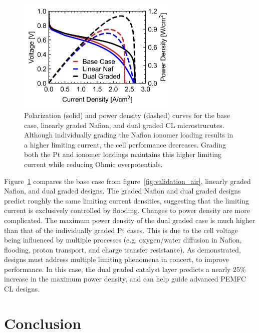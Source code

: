 \documentclass[final,3p,times,twocolumn]{elsarticle}    %
\begin{document}
\begin{figure}[!tb]
    \centering
    \includegraphics[width=3.07in]{figures/dual-grad-3_07.png}
    \caption{Polarization (solid) and power density (dashed) curves for the base case, linearly graded Nafion, and dual graded CL microstrucutes. Although individually grading the Nafion ionomer loading results in a higher limiting current, the cell performance decreases. Grading both the Pt and ionomer loadings maintains this higher limiting current while reducing Ohmic overpotentials.}
    \label{fig:dual-graded}
\end{figure}

Figure~\ref{fig:dual-graded} compares the base case from figure~\ref{fig:validation_air}, linearly graded Nafion, and dual graded designs. The graded Nafion and dual graded designs predict roughly the same limiting current densities, suggesting that the limiting current is exclusively controlled by flooding. Changes to power density are more complicated. The maximum power density of the dual graded case is much higher than that of the individually graded Pt cases. This is due to the cell voltage being influenced by multiple processes (e.g. oxygen/water diffusion in Nafion, flooding, proton transport, and charge transfer resistance). As demonstrated, designs must address multiple limiting phenomena in concert, to improve performance. In this case, the dual graded catalyst layer predicts a nearly 25\% increase in the maximum power density, and can help guide advanced PEMFC CL designs.


\section{Conclusion}
\end{document}
